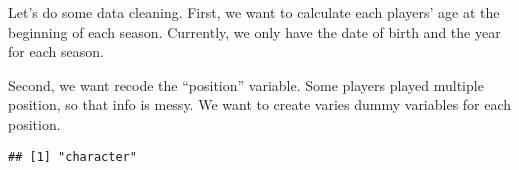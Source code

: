 \documentclass[
]{book}
\newenvironment{Shaded}{\begin{snugshade}}{\end{snugshade}}
\newcommand{\AttributeTok}[1]{\textcolor[rgb]{0.13,0.29,0.53}{#1}}
\newcommand{\CommentTok}[1]{\textcolor[rgb]{0.56,0.35,0.01}{\textit{#1}}}
\newcommand{\FunctionTok}[1]{\textcolor[rgb]{0.13,0.29,0.53}{\textbf{#1}}}
\newcommand{\NormalTok}[1]{#1}
\newcommand{\OtherTok}[1]{\textcolor[rgb]{0.56,0.35,0.01}{#1}}
\newcommand{\SpecialCharTok}[1]{\textcolor[rgb]{0.81,0.36,0.00}{\textbf{#1}}}
\begin{document}
Let's do some data cleaning. First, we want to calculate each players' age at the
beginning of each season. Currently, we only have the date of birth and the year
for each season.

Second, we want recode the ``position'' variable. Some players played multiple
position, so that info is messy. We want to create varies dummy variables
for each position.

\begin{Shaded}
\end{Shaded}

\begin{verbatim}
## [1] "character"
\end{verbatim}

\begin{Shaded}
\end{Shaded}
\end{document}
